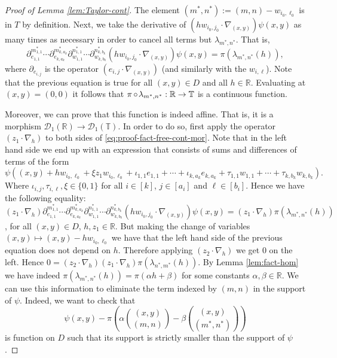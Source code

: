 \documentclass[a4paper,12pt,reqno]{amsart}
\theoremstyle{definition}
\def\to{\rightarrow}
\newcommand{\mc}{\mathcal}
\newcommand{\mb}{\mathbb}
\DeclareMathOperator{\co}{\circ\hspace{-0.02 cm}}
\begin{document}
\begin{proof}[Proof of Lemma \ref{lem:Taylor-cont}]
The element $(m^*,n^*):=(m,n)-w_{i_0,\ell_0}$ is in $T$ by definition. Next, we take the derivative of $(hw_{i_0,j_0}\cdot \nabla_{(x,y)})\psi(x,y)$ as many times as necessary in order to cancel all terms but $\lambda_{m^*,n^*}$. That is,
\begin{equation}\label{eq:proof-fact-free-cont-mor}
\partial_{e_{1,1}}^{m^*_{1,1}}\cdots \partial_{e_{k,a_k}}^{m^*_{k,a_k}}\partial_{w_{1,1}}^{n^*_{1,1}}\cdots \partial_{w_{k,b_k}}^{n^*_{k,b_k}} (hw_{i_0,j_0}\cdot \nabla_{(x,y)})\psi(x,y) = \pi(\lambda_{m^*,n^*}(h)),
\end{equation}
where $\partial_{e_{i,j}}$ is the operator $(e_{i,j}\cdot \nabla_{(x,y)})$ (and similarly with the $w_{i,\ell}$). Note that the previous equation is true for all $(x,y)\in D$ and all $h\in \mb{R}$. Evaluating at $(x,y)=(0,0)$ it follows that $\pi\co \lambda_{m^*,n^*}:\mb{R}\to \mb{T}$ is a continuous function.

Moreover, we can prove that this function is indeed affine. That is, it is a morphism $\mc{D}_1(\mb{R})\to \mc{D}_1(\mb{T})$. In order to do so, first apply the operator $(z_1\cdot \nabla_h)$ to both sides of \eqref{eq:proof-fact-free-cont-mor}. Note that in the left hand side we end up with an expression that consists of sums and differences of terms of the form
\[
\psi\left((x,y)+hw_{i_0,\ell_0}+\xi z_1 w_{i_0,\ell_0}+\iota_{1,1}e_{1,1}+\cdots+\iota_{k,a_k}e_{k,a_k}+\tau_{1,1}w_{1,1}+\cdots+\tau_{k,b_k}w_{k,b_k}
\right).
\]
Where $\iota_{i,j},\tau_{i,\ell},\xi\in \{0,1\}$ for all $i\in[k]$, $j\in[a_i]$ and $\ell\in[b_i]$. Hence we have the following equality: $(z_1\cdot \nabla_h)\partial_{e_{1,1}}^{m^*_{1,1}}\cdots \partial_{e_{k,a_k}}^{m^*_{k,a_k}}\partial_{w_{1,1}}^{n^*_{1,1}}\cdots \partial_{w_{k,b_k}}^{n^*_{k,b_k}} (hw_{i_0,j_0}\cdot \nabla_{(x,y)})\psi(x,y) = (z_1\cdot \nabla_h)\pi(\lambda_{m^*,n^*}(h))$, for all $(x,y)\in D$, $h,z_1\in \mb{R}$. But making the change of variables $(x,y)\mapsto (x,y)-hw_{i_0,\ell_0}$ we have that the left hand side of the previous equation does not depend on $h$. Therefore applying $(z_2\cdot \nabla_h)$ we get 0 on the  left. Hence
 $0 = (z_2\cdot \nabla_h)(z_1\cdot \nabla_h)\pi(\lambda_{n^*,m^*}(h))$. By Lemma \ref{lem:fact-hom} we have  indeed $\pi(\lambda_{m^*,n^*}(h)) = \pi(\alpha h+\beta)$ for some constants $\alpha,\beta\in \mb{R}$. We can use this information to eliminate the term indexed by $(m,n)$ in the support of $\psi$. Indeed, we want to check that
\begin{equation}\label{eq:reduc-degree}
\psi(x,y)-\pi\left(\alpha \binom{(x,y)}{(m,n)}-\beta \binom{(x,y)}{(m^*,n^*)}\right)
\end{equation}
is function on $D$ such that its support is strictly smaller than the support of $\psi$.


\end{proof}
\end{document}
